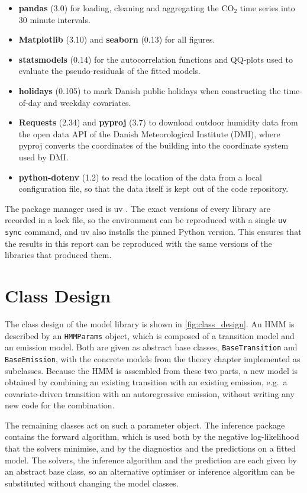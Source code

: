 \begin{itemize}
    \item \textbf{pandas} (3.0) for loading, cleaning and aggregating the
    $\text{CO}_2$ time series into 30 minute intervals.
    \item \textbf{Matplotlib} (3.10) and \textbf{seaborn} (0.13) for all
    figures.
    \item \textbf{statsmodels} (0.14) for the autocorrelation functions and
    QQ-plots used to evaluate the pseudo-residuals of the fitted models.
    \item \textbf{holidays} (0.105) to mark Danish public holidays when
    constructing the time-of-day and weekday covariates.
    \item \textbf{Requests} (2.34) and \textbf{pyproj} (3.7) to download outdoor
    humidity data from the open data API of the Danish Meteorological Institute
    (DMI), where pyproj converts the coordinates of the building into the
    coordinate system used by DMI.
    \item \textbf{python-dotenv} (1.2) to read the location of the data from a
    local configuration file, so that the data itself is kept out of the code
    repository.
\end{itemize}
The package manager used is uv \parencite{uv}. The exact versions of every
library are recorded in a lock file, so the environment can be reproduced with
a single \texttt{uv sync} command, and uv also installs the pinned Python
version. This ensures that the results in this report can be reproduced with
the same versions of the libraries that produced them.

\section{Class Design}
The class design of the model library is shown in \cref{fig:class_design}.
An HMM is described by an \texttt{HMMParams} object, which is composed of a
transition model and an emission model. Both are given as abstract base classes,
\texttt{BaseTransition} and \texttt{BaseEmission}, with the concrete models
from the theory chapter implemented as subclasses. Because the HMM is
assembled from these two parts, a new model is obtained by combining an existing
transition with an existing emission, e.g.\ a covariate-driven transition with
an autoregressive emission, without writing any new code for the combination.

The remaining classes act on such a parameter object. The inference package
contains the forward algorithm, which is used both by the negative
log-likelihood that the solvers minimise, and by the diagnostics and the
predictions on a fitted model. The solvers, the inference algorithm and the
prediction are each given by an abstract base class, so an alternative
optimiser or inference algorithm can be substituted without changing the model
classes.

